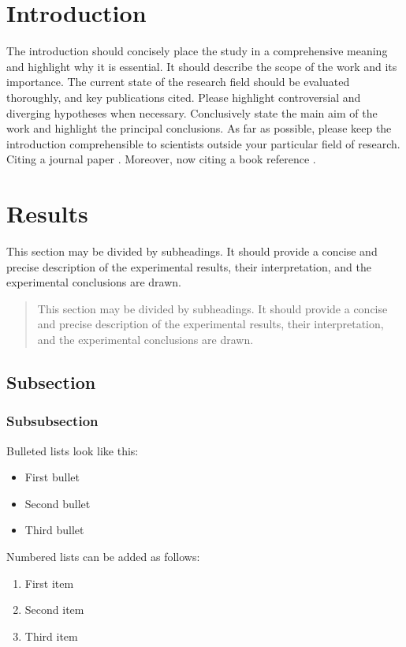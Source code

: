 \documentclass[SCMIJ,viewpoint ,submit,moreauthors,pdftex]{Files/scmij}
\begin{document}
\section{Introduction}
The introduction should concisely place the study in a comprehensive meaning and highlight why it is essential. It should describe the scope of the work and its importance. The current state of the research field should be evaluated thoroughly, and key publications cited. Please highlight controversial and diverging hypotheses when necessary. Conclusively state the main aim of the work and highlight the principal conclusions. As far as possible, please keep the introduction comprehensible to scientists outside your particular field of research. Citing a journal paper \cite{ref-journal}. Moreover, now citing a book reference \cite{ref-book}. 


\section{Results}

This section may be divided by subheadings. It should provide a concise and precise description of the experimental results, their interpretation, and the experimental conclusions are drawn.
\begin{quote}
This section may be divided by subheadings. It should provide a concise and precise description of the experimental results, their interpretation, and the experimental conclusions are drawn.
\end{quote}

\subsection{Subsection}
\unskip
\subsubsection{Subsubsection}

Bulleted lists look like this:
\begin{itemize}[leftmargin=*,labelsep=5.8mm]
\item	First bullet
\item	Second bullet
\item	Third bullet
\end{itemize}

Numbered lists can be added as follows:
\begin{enumerate}[leftmargin=*,labelsep=4.9mm]
\item	First item 
\item	Second item
\item	Third item
\end{enumerate}
\end{document}
